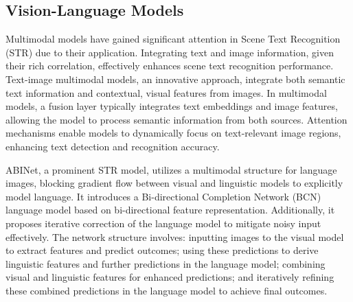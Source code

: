 \documentclass[runningheads]{llncs}
\begin{document}
\subsection{Vision-Language Models} \label{subsec:vision-language}
Multimodal models have gained significant attention in Scene Text Recognition (STR) due to their application.	Integrating text and image information, given their rich correlation, effectively enhances scene text recognition performance.	Text-image multimodal models, an innovative approach, integrate both semantic text information and contextual, visual features from images.	In multimodal models, a fusion layer typically integrates text embeddings and image features, allowing the model to process semantic information from both sources.	Attention mechanisms enable models to dynamically focus on text-relevant image regions, enhancing text detection and recognition accuracy.	

ABINet, a prominent STR model, utilizes a multimodal structure for language images, blocking gradient flow between visual and linguistic models to explicitly model language.	It introduces a Bi-directional Completion Network (BCN) language model based on bi-directional feature representation.	Additionally, it proposes iterative correction of the language model to mitigate noisy input effectively.	The network structure involves: inputting images to the visual model to extract features and predict outcomes; using these predictions to derive linguistic features and further predictions in the language model; combining visual and linguistic features for enhanced predictions; and iteratively refining these combined predictions in the language model to achieve final outcomes.	
\end{document}

